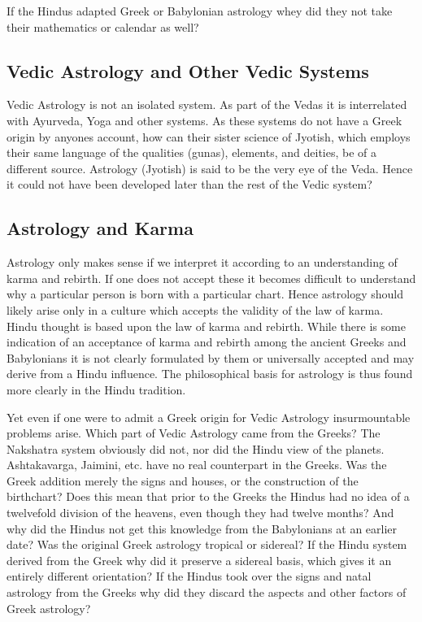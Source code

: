  

If the Hindus adapted Greek or Babylonian astrology whey did they not take their mathematics or calendar as well?

 

\subsection{Vedic Astrology and Other Vedic Systems}
 

Vedic Astrology is not an isolated system. As part of the Vedas it is interrelated with Ayurveda, Yoga and other systems. As these systems do not have a Greek origin by anyones account, how can their sister science of Jyotish, which employs their same language of the qualities (gunas), elements, and deities, be of a different source. Astrology (Jyotish) is said to be the very eye of the Veda. Hence it could not have been developed later than the rest of the Vedic system?

 

\subsection{Astrology and Karma}

 

Astrology only makes sense if we interpret it according to an understanding of karma and rebirth. If one does not accept these it becomes difficult to understand why a particular person is born with a particular chart. Hence astrology should likely arise only in a culture which accepts the validity of the law of karma. Hindu thought is based upon the law of karma and rebirth. While there is some indication of an acceptance of karma and rebirth among the ancient Greeks and Babylonians it is not clearly formulated by them or universally accepted and may derive from a Hindu influence. The philosophical basis for astrology is thus found more clearly in the Hindu tradition.

 

Yet even if one were to admit a Greek origin for Vedic Astrology insurmountable problems arise. Which part of Vedic Astrology came from the Greeks? The Nakshatra system obviously did not, nor did the Hindu view of the planets. Ashtakavarga, Jaimini, etc. have no real counterpart in the Greeks. Was the Greek addition merely the signs and houses, or the construction of the birthchart? Does this mean that prior to the Greeks the Hindus had no idea of a twelvefold division of the heavens, even though they had twelve months? And why did the Hindus not get this knowledge from the Babylonians at an earlier date? Was the original Greek astrology tropical or sidereal? If the Hindu system derived from the Greek why did it preserve a sidereal basis, which gives it an entirely different orientation? If the Hindus took over the signs and natal astrology from the Greeks why did they discard the aspects and other factors of Greek astrology?

